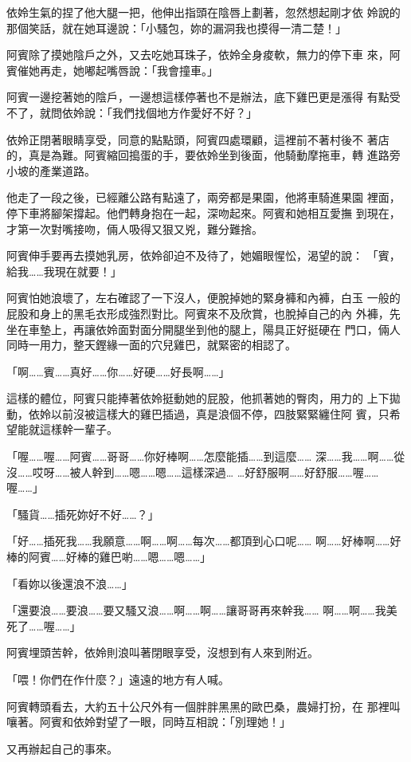 依姈生氣的捏了他大腿一把，他伸出指頭在陰唇上劃著，忽然想起剛才依
姈說的那個笑話，就在她耳邊說：「小騷包，妳的漏洞我也摸得一清二楚！」

阿賓除了摸她陰戶之外，又去吃她耳珠子，依姈全身痠軟，無力的停下車
來，阿賓催她再走，她嘟起嘴唇說：「我會撞車。」

阿賓一邊挖著她的陰戶，一邊想這樣停著也不是辦法，底下雞巴更是漲得
有點受不了，就問依姈說：「我們找個地方作愛好不好？」

依姈正閉著眼睛享受，同意的點點頭，阿賓四處環顧，這裡前不著村後不
著店的，真是為難。阿賓縮回搗蛋的手，要依姈坐到後面，他騎動摩拖車，轉
進路旁小坡的產業道路。

他走了一段之後，已經離公路有點遠了，兩旁都是果園，他將車騎進果園
裡面，停下車將腳架撐起。他們轉身抱在一起，深吻起來。阿賓和她相互愛撫
到現在，才第一次對嘴接吻，倆人吸得又狠又兇，難分難捨。

阿賓伸手要再去摸她乳房，依姈卻迫不及待了，她媚眼惺忪，渴望的說：
「賓，給我……我現在就要！」

阿賓怕她浪壞了，左右確認了一下沒人，便脫掉她的緊身褲和內褲，白玉
一般的屁股和身上的黑毛衣形成強烈對比。阿賓來不及欣賞，也脫掉自己的內
外褲，先坐在車墊上，再讓依姈面對面分開腿坐到他的腿上，陽具正好挺硬在
門口，倆人同時一用力，整天鏗緣一面的穴兒雞巴，就緊密的相認了。

「啊……賓……真好……你……好硬……好長啊……」

這樣的體位，阿賓只能捧著依姈挺動她的屁股，他抓著她的臀肉，用力的
上下拋動，依姈以前沒被這樣大的雞巴插過，真是浪個不停，四肢緊緊纏住阿
賓，只希望能就這樣幹一輩子。

「喔……喔……阿賓……哥哥……你好棒啊……怎麼能插……到這麼……
深……我……啊……從沒……哎呀……被人幹到……嗯……嗯……這樣深過…
…好舒服啊……好舒服……喔……喔……」

「騷貨……插死妳好不好……？」

「好……插死我……我願意……啊……啊……每次……都頂到心口呢……
啊……好棒啊……好棒的阿賓……好棒的雞巴喲……嗯……嗯……」

「看妳以後還浪不浪……」

「還要浪……要浪……要又騷又浪……啊……啊……讓哥哥再來幹我……
啊……啊……我美死了……喔……」

阿賓埋頭苦幹，依姈則浪叫著閉眼享受，沒想到有人來到附近。

「喂！你們在作什麼？」遠遠的地方有人喊。

阿賓轉頭看去，大約五十公尺外有一個胖胖黑黑的歐巴桑，農婦打扮，在
那裡叫嚷著。阿賓和依姈對望了一眼，同時互相說：「別理她！」

又再辦起自己的事來。

